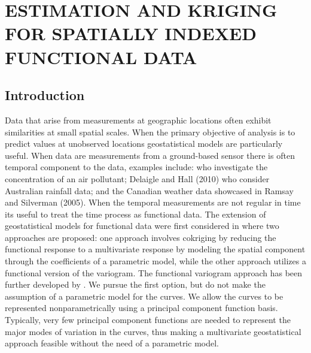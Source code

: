 

\chapter{ESTIMATION AND KRIGING FOR SPATIALLY INDEXED FUNCTIONAL DATA} 
\label{ch:functional kriging}

\section{Introduction} 

\label{sec:introduction}
Data that arise from measurements at geographic locations often exhibit similarities at small spatial scales. When the primary objective of analysis is to predict values at unobserved locations geostatistical models are particularly useful. When data are measurements from a ground-based sensor there is often temporal component to the data, examples include: \cite{Kaiser:2002wna} who investigate the concentration of an air pollutant; Delaigle and Hall (2010) who consider Australian rainfall data; and the Canadian weather data showcased in Ramsay and Silverman (2005). When the temporal measurements are not regular in time its useful to treat the time process as functional data. The extension of geostatistical models for functional data were first considered in \cite{Goulard:1993} where two approaches are proposed: one approach involves cokriging by reducing the functional response to a multivariate response by modeling the spatial component through the coefficients of a parametric model, while the other approach utilizes a functional version of the variogram. The functional variogram approach has been further developed by \cite{Giraldo:2010jx}. We pursue the first option, but do not make the assumption of a parametric model for the curves. We allow the curves to be represented nonparametrically using a principal component function basis. Typically, very few principal component functions are needed to represent the major modes of variation in the curves, thus making a multivariate geostatistical approach feasible without the need of a parametric model. 


